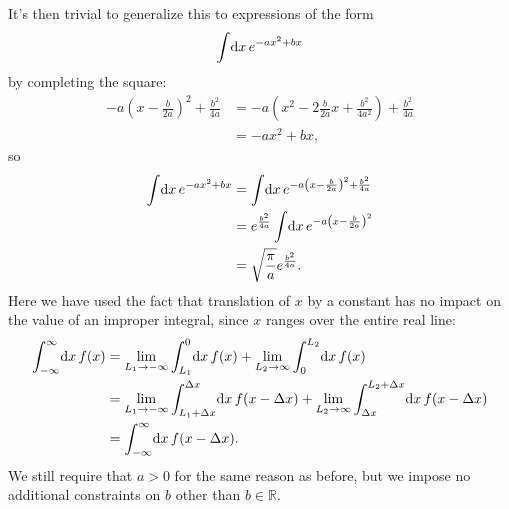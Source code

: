 It's then trivial to generalize this to expressions of the form
\begin{align}
	\int\! \dif x \, e^{-a x^2 + b x}
\end{align}
by completing the square:
\begin{subequations}
\begin{align}
	-a \left( x - \frac{b}{2 a} \right)^2 + \frac{b^2}{4 a}
	&= -a \left( x^2 - 2 \frac{b}{2 a} x + \frac{b^2}{4 a^2} \right) + \frac{b^2}{4 a} \\
	&= -a x^2 + b x,
\end{align}
\end{subequations}
so
\begin{subequations} \label{eq:gaussian-integral-ab}
\begin{align}
	\int\! \dif x \, e^{-a x^2 + b x}
	&= \int\! \dif x \, e^{-a \left( x - \frac{b}{2 a} \right)^2 + \frac{b^2}{4 a}} \\
	&= e^{\frac{b^2}{4 a}} \int\! \dif x \, e^{-a \left( x - \frac{b}{2 a} \right)^2} \\
	&= \sqrt{\frac{\pi}{a}} e^{\frac{b^2}{4 a}}.
\end{align}
\end{subequations}
Here we have used the fact that translation of $x$ by a constant has no impact on the value of an improper integral, since $x$ ranges over the entire real line:
\begin{subequations} \label{eq:infinite-integral-translation}
\begin{align}
	\int_{-\infty}^\infty\! \dif x \, f(x)
	&= \lim_{L_1 \to -\infty} \int_{L_1}^0\! \dif x \, f(x)
		+ \lim_{L_2 \to \infty} \int_0^{L_2}\! \dif x \, f(x) \\
	&= \lim_{L_1 \to -\infty} \int_{L_1 + \Delta x}^{\Delta x}\! \dif x \, f(x - \Delta x)
		+ \lim_{L_2 \to \infty} \int_{\Delta x}^{L_2 + \Delta x}\! \dif x \, f(x - \Delta x) \\
	&= \int_{-\infty}^\infty\! \dif x \, f(x - \Delta x).
\end{align}
\end{subequations}
We still require that $a > 0$ for the same reason as before, but we impose no additional constraints on $b$ other than $b \in \mathbb{R}$.

